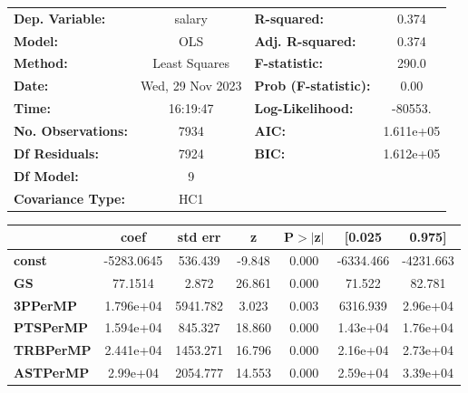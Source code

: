 \begin{center}
\begin{tabular}{lclc}
\toprule
\textbf{Dep. Variable:}    &      salary      & \textbf{  R-squared:         } &     0.374   \\
\textbf{Model:}            &       OLS        & \textbf{  Adj. R-squared:    } &     0.374   \\
\textbf{Method:}           &  Least Squares   & \textbf{  F-statistic:       } &     290.0   \\
\textbf{Date:}             & Wed, 29 Nov 2023 & \textbf{  Prob (F-statistic):} &     0.00    \\
\textbf{Time:}             &     16:19:47     & \textbf{  Log-Likelihood:    } &   -80553.   \\
\textbf{No. Observations:} &        7934      & \textbf{  AIC:               } & 1.611e+05   \\
\textbf{Df Residuals:}     &        7924      & \textbf{  BIC:               } & 1.612e+05   \\
\textbf{Df Model:}         &           9      & \textbf{                     } &             \\
\textbf{Covariance Type:}  &       HC1        & \textbf{                     } &             \\
\bottomrule
\end{tabular}
\begin{tabular}{lcccccc}
                       & \textbf{coef} & \textbf{std err} & \textbf{z} & \textbf{P$> |$z$|$} & \textbf{[0.025} & \textbf{0.975]}  \\
\midrule
\textbf{const}         &   -5283.0645  &      536.439     &    -9.848  &         0.000        &    -6334.466    &    -4231.663     \\
\textbf{GS}            &      77.1514  &        2.872     &    26.861  &         0.000        &       71.522    &       82.781     \\
\textbf{3PPerMP}       &    1.796e+04  &     5941.782     &     3.023  &         0.003        &     6316.939    &     2.96e+04     \\
\textbf{PTSPerMP}      &    1.594e+04  &      845.327     &    18.860  &         0.000        &     1.43e+04    &     1.76e+04     \\
\textbf{TRBPerMP}      &    2.441e+04  &     1453.271     &    16.796  &         0.000        &     2.16e+04    &     2.73e+04     \\
\textbf{ASTPerMP}      &     2.99e+04  &     2054.777     &    14.553  &         0.000        &     2.59e+04    &     3.39e+04     \\

\end{tabular}
\end{center}

